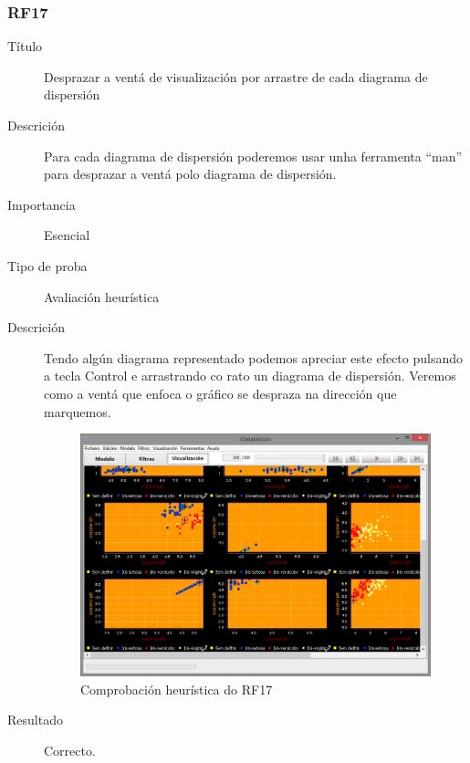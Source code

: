 \subsubsection*{RF17}
\begin{description}
\item[Título] \hfill
Desprazar a ventá de visualización por arrastre de cada diagrama de dispersión
\item[Descrición] \hfill
Para cada diagrama de dispersión poderemos usar unha ferramenta ``man'' para desprazar a ventá polo diagrama de dispersión.
\item[Importancia] \hfill
Esencial
\item[Tipo de proba] \hfill
Avaliación heurística
\item[Descrición]
Tendo algún diagrama representado podemos apreciar este efecto pulsando a tecla Control e arrastrando co rato un diagrama de dispersión. Veremos como a ventá que enfoca o gráfico se despraza na dirección que marquemos.
\begin{figure}
\centering
\includegraphics[width=\textwidth,height=\textheight,keepaspectratio]{figuras/RF17}
\caption{Comprobación heurística do RF17}
\label{RF17}
\end{figure}
\item[Resultado]
Correcto.
\end{description}

